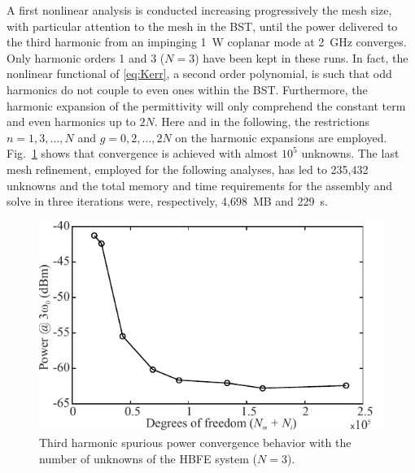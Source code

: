 \documentclass[AMA,STIX2COL]{WileyNJD-v2}
\begin{document}
A first nonlinear analysis is conducted increasing progressively the mesh size, with particular attention to the mesh in the BST, until the power delivered to the third harmonic from an impinging 1~W coplanar mode at 2~GHz converges. Only harmonic orders 1 and 3 ($N=3$) have been kept in these runs. In fact, the nonlinear functional of \eqref{eq:Kerr}, a second order polynomial, is such that odd harmonics do not couple to even ones within the BST. Furthermore, the harmonic expansion of the permittivity will only comprehend the constant term and even harmonics up to $2N$. Here and in the following, the restrictions \mbox{$n=1,3,\ldots,N$} and \mbox{$g=0,2,\ldots,2N$} on the harmonic expansions are employed. Fig.~\ref{fig:convergence} shows that convergence is achieved with almost $10^5$ unknowns. The last mesh refinement, employed for the following analyses, has led to 235,432 unknowns and the total memory and time requirements for the assembly and solve in three iterations were, respectively, 4,698~MB and 229~s.
%
\begin{figure}[ht!]
\centering
\includegraphics[width=\columnwidth]{convergence}
\caption{Third harmonic spurious power convergence behavior with the number of unknowns of the HBFE system ($N=3$).}
\label{fig:convergence}
\end{figure}
\end{document}
